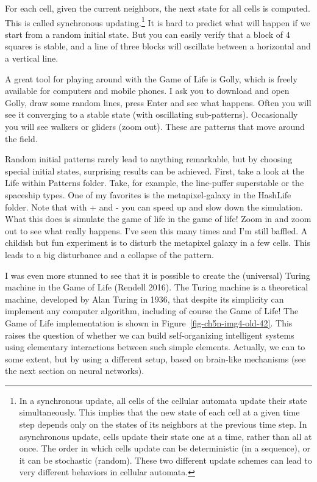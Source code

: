 \documentclass[
  a4paper,
  DIV=11,
  numbers=noendperiod,
  oneside]{scrreprt}
\begin{document}
For each cell, given the current neighbors, the next state for all cells
is computed. This is called synchronous updating.\footnote{In a
  synchronous update, all cells of the cellular automata update their
  state simultaneously. This implies that the new state of each cell at
  a given time step depends only on the states of its neighbors at the
  previous time step. In asynchronous update, cells update their state
  one at a time, rather than all at once. The order in which cells
  update can be deterministic (in a sequence), or it can be stochastic
  (random). These two different update schemes can lead to very
  different behaviors in cellular automata.} It is hard to predict what
will happen if we start from a random initial state. But you can easily
verify that a block of 4 squares is stable, and a line of three blocks
will oscillate between a horizontal and a vertical line.

A great tool for playing around with the Game of Life is Golly, which is
freely available for computers and mobile phones. I ask you to download
and open Golly, draw some random lines, press Enter and see what
happens. Often you will see it converging to a stable state (with
oscillating sub-patterns). Occasionally you will see walkers or gliders
(zoom out). These are patterns that move around the field.

Random initial patterns rarely lead to anything remarkable, but by
choosing special initial states, surprising results can be achieved.
First, take a look at the Life within Patterns folder. Take, for
example, the line-puffer superstable or the spaceship types. One of my
favorites is the metapixel-galaxy in the HashLife folder. Note that with
+ and - you can speed up and slow down the simulation. What this does is
simulate the game of life in the game of life! Zoom in and zoom out to
see what really happens. I've seen this many times and I'm still
baffled. A childish but fun experiment is to disturb the metapixel
galaxy in a few cells. This leads to a big disturbance and a collapse of
the pattern.

I was even more stunned to see that it is possible to create the
(universal) Turing machine in the Game of Life (Rendell 2016). The
Turing machine is a theoretical machine, developed by Alan Turing in
1936, that despite its simplicity can implement any computer algorithm,
including of course the Game of Life! The Game of Life implementation is
shown in Figure~\ref{fig-ch5n-img4-old-42}. This raises the question of
whether we can build self-organizing intelligent systems using
elementary interactions between such simple elements. Actually, we can
to some extent, but by using a different setup, based on brain-like
mechanisms (see the next section on neural networks).
\end{document}
